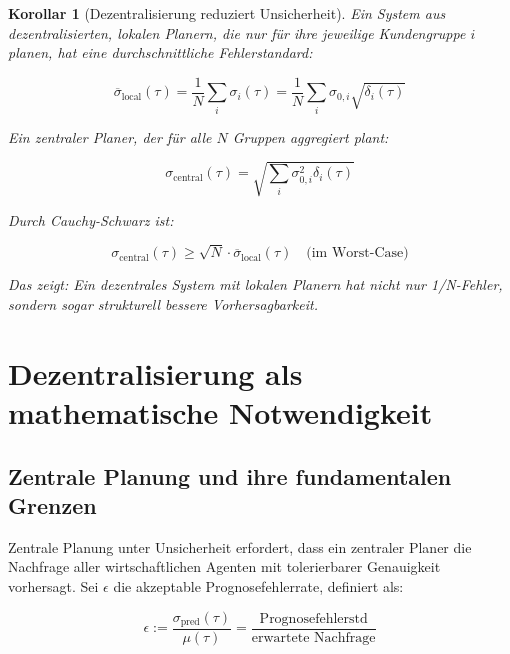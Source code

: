\documentclass[12pt, a4paper, titlepage]{report}
\newtheorem{corollary}[theorem]{Korollar}
\theoremstyle{definition}
\theoremstyle{remark}
\begin{document}
\begin{corollary}[Dezentralisierung reduziert Unsicherheit]
Ein System aus dezentralisierten, lokalen Planern, die nur für ihre jeweilige Kundengruppe $i$ planen, hat eine durchschnittliche Fehlerstandard:

\begin{equation}
\overline{\sigma}_{\text{local}}(\tau) = \frac{1}{N} \sum_i \sigma_i(\tau) = \frac{1}{N} \sum_i \sigma_{0,i} \sqrt{\delta_i(\tau)}
\end{equation}

Ein zentraler Planer, der für alle $N$ Gruppen aggregiert plant:

\begin{equation}
\sigma_{\text{central}}(\tau) = \sqrt{\sum_i \sigma_{0,i}^2 \delta_i(\tau)}
\end{equation}

Durch Cauchy-Schwarz ist:

\begin{equation}
\sigma_{\text{central}}(\tau) \geq \sqrt{N} \cdot \overline{\sigma}_{\text{local}}(\tau) \quad \text{(im Worst-Case)}
\end{equation}

Das zeigt: Ein dezentrales System mit lokalen Planern hat nicht nur 1/N-Fehler, sondern sogar strukturell bessere Vorhersagbarkeit.
\end{corollary}

\chapter{Dezentralisierung als mathematische Notwendigkeit}
\label{sec:dezentralisierung}

\section{Zentrale Planung und ihre fundamentalen Grenzen}

Zentrale Planung unter Unsicherheit erfordert, dass ein zentraler Planer die Nachfrage aller wirtschaftlichen Agenten mit tolerierbarer Genauigkeit vorhersagt. Sei $\epsilon$ die akzeptable Prognosefehlerrate, definiert als:

\begin{equation}
\epsilon := \frac{\sigma_{\text{pred}}(\tau)}{\mu(\tau)} = \frac{\text{Prognosefehlerstd}}{\text{erwartete Nachfrage}}
\label{eq:error_rate}
\end{equation}
\end{document}
